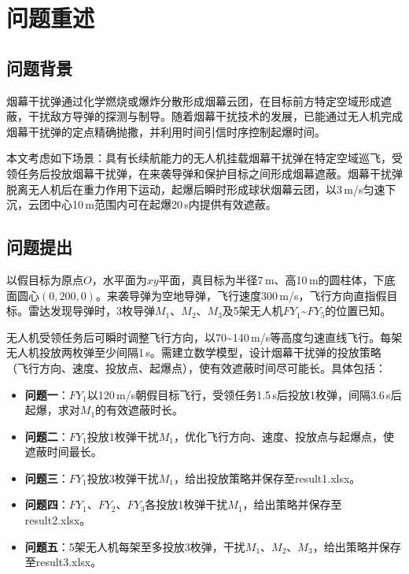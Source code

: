 \documentclass[12pt,a4paper]{article}
\begin{document}
\section{问题重述}

\subsection{问题背景}

烟幕干扰弹通过化学燃烧或爆炸分散形成烟幕云团，在目标前方特定空域形成遮蔽，干扰敌方导弹的探测与制导。随着烟幕干扰技术的发展，已能通过无人机完成烟幕干扰弹的定点精确抛撒，并利用时间引信时序控制起爆时间。

本文考虑如下场景：具有长续航能力的无人机挂载烟幕干扰弹在特定空域巡飞，受领任务后投放烟幕干扰弹，在来袭导弹和保护目标之间形成烟幕遮蔽。烟幕干扰弹脱离无人机后在重力作用下运动，起爆后瞬时形成球状烟幕云团，以3\,m/s匀速下沉，云团中心10\,m范围内可在起爆20\,s内提供有效遮蔽。

\subsection{问题提出}

以假目标为原点$O$，水平面为$xy$平面，真目标为半径7\,m、高10\,m的圆柱体，下底面圆心$(0, 200, 0)$。来袭导弹为空地导弹，飞行速度300\,m/s，飞行方向直指假目标。雷达发现导弹时，3枚导弹$M_1$、$M_2$、$M_3$及5架无人机$FY_1$\textasciitilde$FY_5$的位置已知。

无人机受领任务后可瞬时调整飞行方向，以70\textasciitilde140\,m/s等高度匀速直线飞行。每架无人机投放两枚弹至少间隔1\,s。需建立数学模型，设计烟幕干扰弹的投放策略（飞行方向、速度、投放点、起爆点），使有效遮蔽时间尽可能长。具体包括：

\begin{itemize}[nosep]
  \item \textbf{问题一}：$FY_1$以120\,m/s朝假目标飞行，受领任务1.5\,s后投放1枚弹，间隔3.6\,s后起爆，求对$M_1$的有效遮蔽时长。
  \item \textbf{问题二}：$FY_1$投放1枚弹干扰$M_1$，优化飞行方向、速度、投放点与起爆点，使遮蔽时间最长。
  \item \textbf{问题三}：$FY_1$投放3枚弹干扰$M_1$，给出投放策略并保存至result1.xlsx。
  \item \textbf{问题四}：$FY_1$、$FY_2$、$FY_3$各投放1枚弹干扰$M_1$，给出策略并保存至result2.xlsx。
  \item \textbf{问题五}：5架无人机每架至多投放3枚弹，干扰$M_1$、$M_2$、$M_3$，给出策略并保存至result3.xlsx。
\end{itemize}
\end{document}

